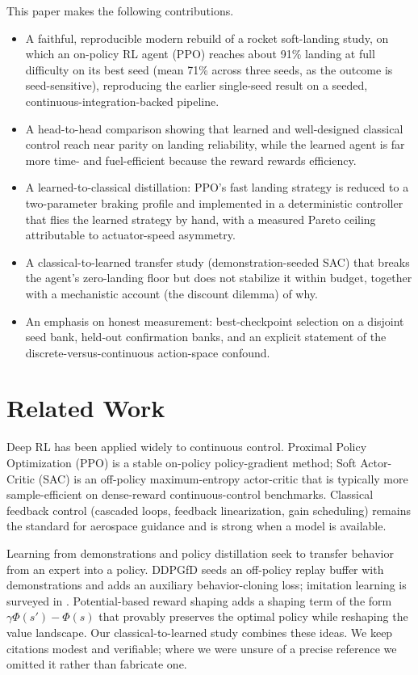 \documentclass[10pt,twocolumn]{article}
\begin{document}
This paper makes the following contributions.
\begin{itemize}
  \item A faithful, reproducible modern rebuild of a rocket soft-landing study, on which an on-policy RL agent (PPO) reaches about 91\% landing at full difficulty on its best seed (mean 71\% across three seeds, as the outcome is seed-sensitive), reproducing the earlier single-seed result on a seeded, continuous-integration-backed pipeline.
  \item A head-to-head comparison showing that learned and well-designed classical control reach near parity on landing reliability, while the learned agent is far more time- and fuel-efficient because the reward rewards efficiency.
  \item A learned-to-classical distillation: PPO's fast landing strategy is reduced to a two-parameter braking profile and implemented in a deterministic controller that flies the learned strategy by hand, with a measured Pareto ceiling attributable to actuator-speed asymmetry.
  \item A classical-to-learned transfer study (demonstration-seeded SAC) that breaks the agent's zero-landing floor but does not stabilize it within budget, together with a mechanistic account (the discount dilemma) of why.
  \item An emphasis on honest measurement: best-checkpoint selection on a disjoint seed bank, held-out confirmation banks, and an explicit statement of the discrete-versus-continuous action-space confound.
\end{itemize}

\section{Related Work}

Deep RL has been applied widely to continuous control. Proximal Policy Optimization (PPO) \cite{schulman2017ppo} is a stable on-policy policy-gradient method; Soft Actor-Critic (SAC) \cite{haarnoja2018sac} is an off-policy maximum-entropy actor-critic that is typically more sample-efficient on dense-reward continuous-control benchmarks. Classical feedback control (cascaded loops, feedback linearization, gain scheduling) remains the standard for aerospace guidance and is strong when a model is available.

Learning from demonstrations and policy distillation seek to transfer behavior from an expert into a policy. DDPGfD \cite{vecerik2017ddpgfd} seeds an off-policy replay buffer with demonstrations and adds an auxiliary behavior-cloning loss; imitation learning is surveyed in \cite{hussein2017imitation}. Potential-based reward shaping \cite{ng1999shaping} adds a shaping term of the form $\gamma\Phi(s')-\Phi(s)$ that provably preserves the optimal policy while reshaping the value landscape. Our classical-to-learned study combines these ideas. We keep citations modest and verifiable; where we were unsure of a precise reference we omitted it rather than fabricate one.
\end{document}
